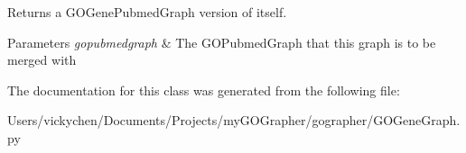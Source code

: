 Returns a GOGenePubmedGraph version of itself. 


\begin{DoxyParams}{Parameters}
{\em gopubmedgraph} & The GOPubmedGraph that this graph is to be merged with \\
\hline
\end{DoxyParams}


The documentation for this class was generated from the following file:\begin{DoxyCompactItemize}
\item 
Users/vickychen/Documents/Projects/myGOGrapher/gographer/GOGeneGraph.py\end{DoxyCompactItemize}
